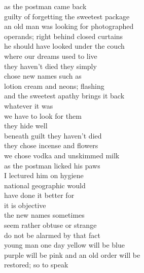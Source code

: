 as the postman came back\\
guilty of forgetting the sweetest package\\
an old man was looking for photographed\\
operands; right behind closed curtains\\
he should have looked under the couch\\
where our dreams used to live\\
they haven't  died they simply\\
chose new names such as\\
lotion cream and neons; flashing\\
and the sweetest apathy brings it back\\
whatever it was\\

we have to look for them\\
they hide well\\
beneath guilt they haven't died\\
they chose incense and flowers\\
we chose vodka and unskimmed milk\\
as the postman licked his paws\\
I lectured him on hygiene\\
national geographic would\\
have done it better for\\
it is objective\\

the new names sometimes\\
seem rather obtuse or strange\\
do not be alarmed by that fact\\
young man one day yellow will be blue\\
purple will be pink and an old order will be\\
restored; so to speak
